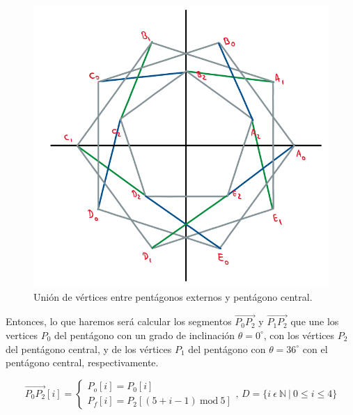\documentclass[oneside, a4paper]{article}
\begin{document}
            \begin{figure}[H]
                \centering
                \includegraphics[scale=0.5]{union_external_to_internal_pentagons.png}
                \caption{Unión de vértices entre pentágonos externos y pentágono central.}
                \label{fig:union_external_to_internal_pentagons}
            \end{figure}

            Entonces, lo que haremos será calcular los segmentos $\overrightarrow{P_{0}P_{2}}$ y $\overrightarrow{P_{1}P_{2}}$ que une los vertices $P_{0}$ del pentágono con un grado de inclinación $\theta = 0^{\circ}$, con los vértices $P_{2}$ del pentágono central, y de los vértices $P_{1}$ del pentágono con $\theta = 36^{\circ}$ con el pentágono central, respectivamente.

            \begin{equation}
                \overrightarrow{P_{0}P_{2}}[i] =
                \begin{cases}
                    P_{o}[i] = P_{0}[i] \\
                    P_{f}[i] = P_{2}[(5 + i - 1) \: \textrm{mod} \: 5]
                \end{cases}
                \textrm{, } D = \{ i \: \epsilon \: \mathbb{N} \: | \: 0 \leqslant i \leqslant 4 \}
                \label{eq:union1_vertices_internal_external_pentagon}
            \end{equation}
            
\end{document}
